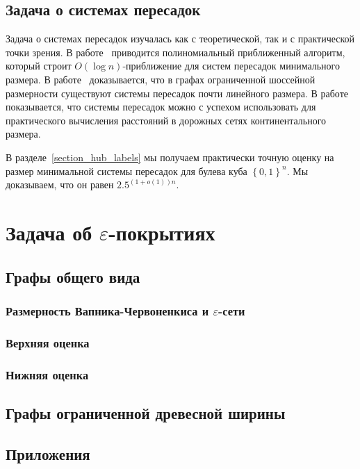 \documentclass[12pt]{article}
\newcommand{\eps}{\varepsilon}
\newcommand{\set}[1]{\left\{#1\right\}}
\newcommand{\zo}{\set{0, 1}}
\begin{document}
    \subsection{Задача о системах пересадок}

    Задача о системах пересадок изучалась как с теоретической, так и с практической точки зрения.
    В работе~\cite{CHKZ02} приводится полиномиальный приближенный алгоритм, который строит $O(\log n)$-приближение
    для систем пересадок минимального размера.
    В работе~\cite{AFGW10} доказывается, что в графах ограниченной шоссейной размерности существуют системы пересадок
    почти линейного размера.
    В работе~\cite{ADGW11} показывается, что системы пересадок можно с успехом использовать для практического
    вычисления расстояний в дорожных сетях континентального размера.

    В разделе~\ref{section_hub_labels} мы получаем практически точную оценку на размер минимальной системы пересадок
    для булева куба $\zo^n$. Мы доказываем, что он равен $2.5^{(1 + o(1)) n}$.
    \section{Задача об $\eps$-покрытиях}
    \label{section_eps_covers}
    \subsection{Графы общего вида}
    \label{subsection_general_graphs}
    \subsubsection{Размерность Вапника-Червоненкиса и $\eps$-сети}
    \subsubsection{Верхняя оценка}
    \subsubsection{Нижняя оценка}
    \subsection{Графы ограниченной древесной ширины}
    \label{subsection_bounded_treewidth}
    \subsection{Приложения}
    \label{subsection_applications}
\end{document}
